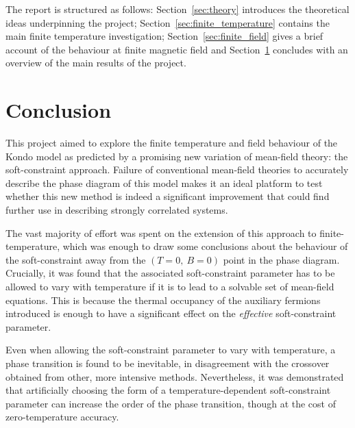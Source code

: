 \documentclass[12pt]{article}
\begin{document}
The report is structured as follows: Section~\ref{sec:theory} introduces the theoretical ideas underpinning the project; Section~\ref{sec:finite_temperature} contains the main finite temperature investigation; Section~\ref{sec:finite_field} gives a brief account of the behaviour at finite magnetic field and Section~\ref{sec:conclusion} concludes with an overview of the main results of the project.









\section{Conclusion}
\label{sec:conclusion}

This project aimed to explore the finite temperature and field behaviour of the Kondo model as predicted by a promising new variation of mean-field theory: the soft-constraint approach. Failure of conventional mean-field theories to accurately describe the phase diagram of this model makes it an ideal platform to test whether this new method is indeed a significant improvement that could find further use in describing strongly correlated systems.

The vast majority of effort was spent on the extension of this approach to finite-temperature, which was enough to draw some conclusions about the behaviour of the soft-constraint away from the $ (T = 0,~B = 0) $ point in the phase diagram. Crucially, it was found that the associated soft-constraint parameter  has to be allowed to vary with temperature if it is to lead to a solvable set of mean-field equations. This is because the thermal occupancy of the auxiliary fermions introduced is enough to have a significant effect on the \emph{effective} soft-constraint parameter.

Even when allowing the soft-constraint parameter to vary with temperature, a phase transition is found to be inevitable, in disagreement with the crossover obtained from other, more intensive methods. Nevertheless, it was demonstrated that artificially choosing the form of a temperature-dependent soft-constraint parameter can increase the order of the phase transition, though at the cost of zero-temperature accuracy.
\end{document}
